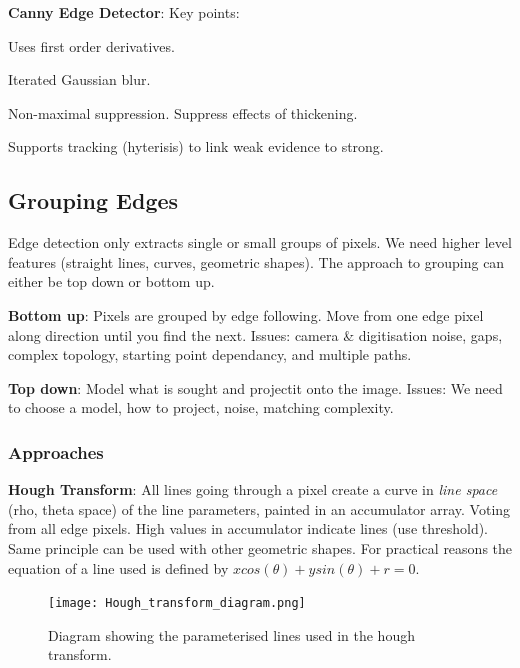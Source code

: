 \documentclass[8pt]{extarticle}
\begin{document}
\begin{multicols}{2}
\textbf{Canny Edge Detector}: Key points:
    \begin{compactitem}
        \item Uses first order derivatives.
        \item Iterated Gaussian blur.
        \item Non-maximal suppression. Suppress effects of thickening.
        \item Supports tracking (hyterisis) to link weak evidence to strong.
    \end{compactitem}

\subsection{Grouping Edges}
Edge detection only extracts single or small groups of pixels. We need higher level features (straight lines, curves, geometric shapes). The approach to grouping can either be top down or bottom up.

\begin{compactitem}
    \item \textbf{Bottom up}: Pixels are grouped by edge following. Move from one edge pixel along direction until you find the next. Issues: camera \& digitisation noise, gaps, complex topology, starting point dependancy, and multiple paths.

    \item \textbf{Top down}: Model what is sought and projectit onto the image. Issues: We need to choose a model, how to project, noise, matching complexity.
\end{compactitem}

\subsubsection{Approaches}

\textbf{Hough Transform}: All lines going through a pixel create a curve in \textit{line space} (rho, theta space) of the line parameters, painted in an accumulator array. Voting from all edge pixels. High values in accumulator indicate lines (use threshold). Same principle can be used with other geometric shapes. For practical reasons the equation of a line used is defined by $x cos(\theta) + y sin(\theta) + r = 0$.\\

\begin{figure}[H]
    \centering
    \texttt{[image: Hough\_transform\_diagram.png]}
    \caption{Diagram showing the parameterised lines used in the hough transform.}
    \label{fig:hough-transform}
\end{figure}


\end{multicols}
\end{document}
